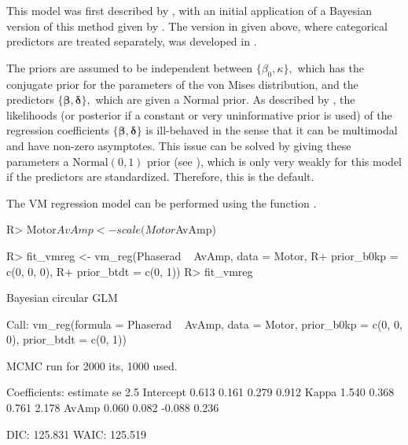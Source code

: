 This model was first described by \citet{fisher1992regression}, with an
initial application of a Bayesian version of this method given by
\citet{gill2010}. The version in  given above, where
categorical predictors are treated separately, was developed in
\citet{mulder2017bayesian}.

The priors are assumed to be independent between
\(\{\beta_0, \kappa\},\) which has the conjugate prior for the
parameters of the von Mises distribution, and the predictors
\(\{\boldsymbol{\beta}, \boldsymbol{\delta}\},\) which are given a
Normal prior. As described by \citet{gill2010}, the likelihoods (or
posterior if a constant or very uninformative prior is used) of the
regression coefficients \(\{\boldsymbol{\beta}, \boldsymbol{\delta}\}\)
is ill-behaved in the sense that it can be multimodal and have non-zero
asymptotes. This issue can be solved by giving these parameters a
\(\text{Normal}(0, 1)\) prior (see \citet{mulder2017bayesian}), which is
only very weakly for this model if the predictors are standardized.
Therefore, this is the default.

The VM regression model can be performed using the function
.

\begin{CodeChunk}

\begin{CodeInput}
R> Motor$AvAmp <- scale(Motor$AvAmp)
\end{CodeInput}
\end{CodeChunk}

\begin{CodeChunk}

\begin{CodeInput}
R> fit_vmreg <- vm_reg(Phaserad ~ AvAmp, data = Motor, 
R+                     prior_b0kp = c(0, 0, 0),
R+                     prior_btdt = c(0, 1))
R> fit_vmreg
\end{CodeInput}

\begin{CodeOutput}
Bayesian circular GLM 

Call:
vm_reg(formula = Phaserad ~ AvAmp, data = Motor, prior_b0kp = c(0, 
    0, 0), prior_btdt = c(0, 1))

MCMC run for 2000 its, 1000 used. 

Coefficients:
          estimate    se   2.5%
Intercept    0.613 0.161  0.279 0.912
Kappa        1.540 0.368  0.761 2.178
AvAmp        0.060 0.082 -0.088 0.236

DIC:  125.831 
WAIC: 125.519 
\end{CodeOutput}
\end{CodeChunk}

